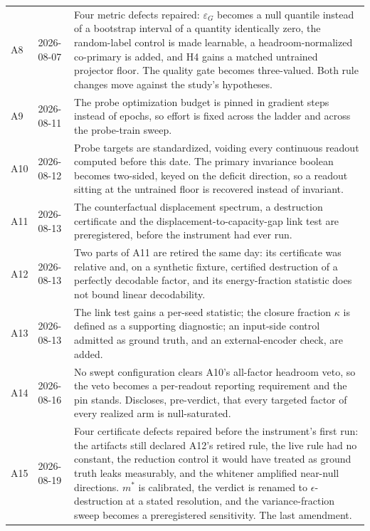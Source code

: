 \documentclass[10pt]{article}
\newcommand{\epsG}{\varepsilon_G}
\begin{document}
{\begin{longtable}{@{}llp{10.4cm}@{}}
A8  & 2026-08-07 & Four metric defects repaired: $\epsG$ becomes a null quantile instead of a
bootstrap interval of a quantity identically zero, the random-label control is made learnable, a
headroom-normalized co-primary is added, and H4 gains a matched untrained projector floor. The
quality gate becomes three-valued. Both rule changes move against the study's hypotheses. \\
A9  & 2026-08-11 & The probe optimization budget is pinned in gradient steps instead of epochs, so
effort is fixed across the ladder and across the probe-train sweep. \\
A10 & 2026-08-12 & Probe targets are standardized, voiding every continuous readout computed before
this date. The primary invariance boolean becomes two-sided, keyed on the deficit direction, so a
readout sitting at the untrained floor is recovered instead of invariant. \\
A11 & 2026-08-13 & The counterfactual displacement spectrum, a destruction certificate and the
displacement-to-capacity-gap link test are preregistered, before the instrument had ever run. \\
A12 & 2026-08-13 & Two parts of A11 are retired the same day: its certificate was relative and, on a
synthetic fixture, certified destruction of a perfectly decodable factor, and its energy-fraction
statistic does not bound linear decodability. \\
A13 & 2026-08-13 & The link test gains a per-seed statistic; the closure fraction $\kappa$ is
defined as a supporting diagnostic; an input-side control admitted as ground truth, and an
external-encoder check, are added. \\
A14 & 2026-08-16 & No swept configuration clears A10's all-factor headroom veto, so the veto becomes
a per-readout reporting requirement and the pin stands. Discloses, pre-verdict, that every targeted
factor of every realized arm is null-saturated. \\
A15 & 2026-08-19 & Four certificate defects repaired before the instrument's first run: the
artifacts still declared A12's retired rule, the live rule had no constant, the reduction control it
would have treated as ground truth leaks measurably, and the whitener amplified near-null
directions. $m^{*}$ is calibrated, the verdict is renamed to $\epsilon$-destruction at a stated
resolution, and the variance-fraction sweep becomes a preregistered sensitivity. The last
amendment. \\
\bottomrule
\end{longtable}
}
\end{document}
